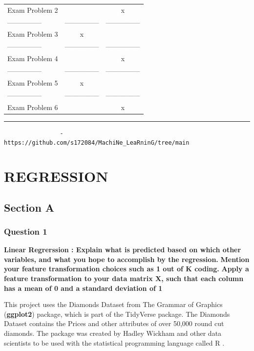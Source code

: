 \documentclass[
]{article}
\begin{document}
\begin{longtable}[]{@{}lcc@{}}
Exam Problem 2 & & x \\
--------------- & --------------- & --------------- \\
Exam Problem 3 & x & \\
--------------- & --------------- & --------------- \\
Exam Problem 4 & & x \\
--------------- & --------------- & --------------- \\
Exam Problem 5 & x & \\
--------------- & --------------- & --------------- \\
Exam Problem 6 & & x \\
\end{longtable}

\begin{center}\rule{0.5\linewidth}{0.5pt}\end{center}

\begin{verbatim}
                - https://github.com/s172084/MachiNe_LeaRninG/tree/main
\end{verbatim}

\newpage

\hypertarget{regression}{%
\section{REGRESSION}\label{regression}}

\hypertarget{section-a}{%
\subsection{Section A}\label{section-a}}

\hypertarget{question-1}{%
\subsubsection{Question 1}\label{question-1}}

\textbf{Linear Regrerssion : Explain what is predicted based on which
other variables, and what you hope to accomplish by the regression.}
\textbf{Mention your feature transformation choices such as 1 out of K
coding.} \textbf{Apply a feature transformation to your data matrix X,
such that each column has a mean of 0 and a standard deviation of 1}

This project uses the Diamonds Dataset from The Grammar of Graphics
(\textbf{ggplot2}) package, which is part of the TidyVerse package. The
Diamonds Dataset contains the Prices and other attributes of over 50,000
round cut diamonds. The package was created by Hadley Wickham and other
data scientists to be used with the statistical programming language
called R .
\end{document}
